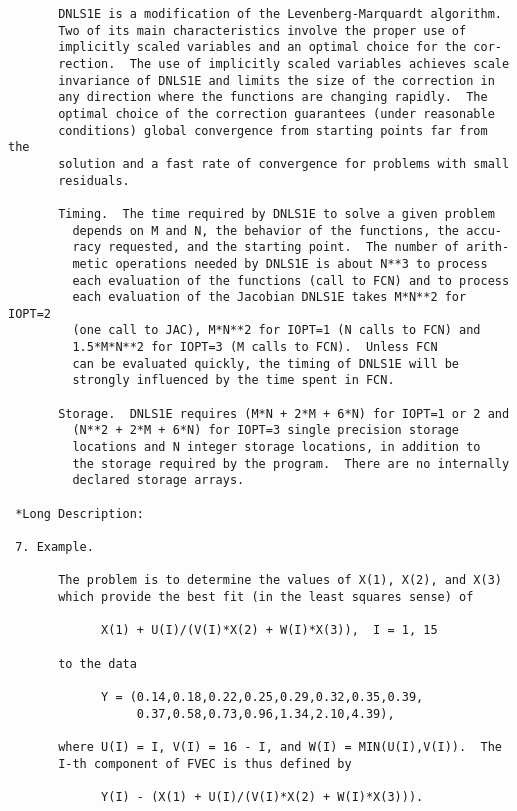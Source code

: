 \begin{verbatim}
       DNLS1E is a modification of the Levenberg-Marquardt algorithm.
       Two of its main characteristics involve the proper use of
       implicitly scaled variables and an optimal choice for the cor-
       rection.  The use of implicitly scaled variables achieves scale
       invariance of DNLS1E and limits the size of the correction in
       any direction where the functions are changing rapidly.  The
       optimal choice of the correction guarantees (under reasonable
       conditions) global convergence from starting points far from the
       solution and a fast rate of convergence for problems with small
       residuals.

       Timing.  The time required by DNLS1E to solve a given problem
         depends on M and N, the behavior of the functions, the accu-
         racy requested, and the starting point.  The number of arith-
         metic operations needed by DNLS1E is about N**3 to process
         each evaluation of the functions (call to FCN) and to process
         each evaluation of the Jacobian DNLS1E takes M*N**2 for IOPT=2
         (one call to JAC), M*N**2 for IOPT=1 (N calls to FCN) and
         1.5*M*N**2 for IOPT=3 (M calls to FCN).  Unless FCN
         can be evaluated quickly, the timing of DNLS1E will be
         strongly influenced by the time spent in FCN.

       Storage.  DNLS1E requires (M*N + 2*M + 6*N) for IOPT=1 or 2 and
         (N**2 + 2*M + 6*N) for IOPT=3 single precision storage
         locations and N integer storage locations, in addition to
         the storage required by the program.  There are no internally
         declared storage arrays.

 *Long Description:

 7. Example.

       The problem is to determine the values of X(1), X(2), and X(3)
       which provide the best fit (in the least squares sense) of

             X(1) + U(I)/(V(I)*X(2) + W(I)*X(3)),  I = 1, 15

       to the data

             Y = (0.14,0.18,0.22,0.25,0.29,0.32,0.35,0.39,
                  0.37,0.58,0.73,0.96,1.34,2.10,4.39),

       where U(I) = I, V(I) = 16 - I, and W(I) = MIN(U(I),V(I)).  The
       I-th component of FVEC is thus defined by

             Y(I) - (X(1) + U(I)/(V(I)*X(2) + W(I)*X(3))).


\end{verbatim}
